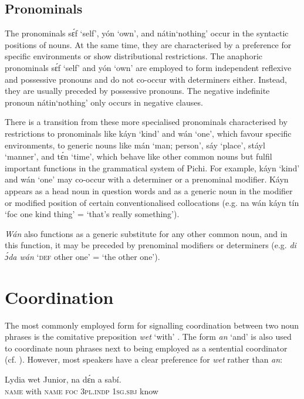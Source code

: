 \subsection{Pronominals}\label{sec:5.4.4}

The pronominals sɛ́f ‘self’, yón ‘own’, {\fff}and nátin‘nothing’ occur in the syntactic positions of nouns. At the same time, they are characterised by a preference for specific environments or show distributional restrictions. The anaphoric pronominals sɛ́f ‘self’ and yón ‘own’ are employed to form independent reflexive{\fff} and possessive pronouns and do not co-occur with determiners either. Instead, they are usually preceded by possessive pronouns. The negative indefinite pronoun nátin‘nothing’ only occurs in negative clauses. 


There is a transition from these more specialised pronominals characterised by restrictions to pronominals like káyn ‘kind’ and wán ‘one’, which favour specific environments, to generic nouns like mán ‘man; person’, sáy ‘place’, stáyl ‘manner’, and tɛ́n ‘time’, which behave like other common nouns but fulfil important functions in the grammatical system of Pichi. For example, káyn ‘kind’ and wán ‘one’ may co-occur with a determiner or a prenominal modifier. Káyn appears as a head noun in question words and as a generic noun{\fff} in the modifier or modified position of certain conventionalised collocations (e.g. na wán káyn tín ‘foc one kind thing’ = ‘that’s really something’). 



\textit{Wán} also functions as a generic substitute for any other common noun, and in this function, it may be preceded by prenominal modifiers or determiners (e.g. \textit{di ɔ́da wán} ‘\textsc{def} other one’ = ‘the other one’). 


\section{Coordination}\label{sec:5.5}

The most commonly employed form for signalling coordination between two noun phrases is the comitative preposition \textit{wet} ‘with’ . The form \textit{an} ‘and’ is also used to coordinate noun phrases  next to being employed as a sentential coordinator (cf. ). However, most speakers have a clear preference for \textit{wet} rather than \textit{an}: 


\ea%
    \label{ex:key:297}
    \gll Lydia  wet    Junior,  na  dɛ́n    a    sabí.\\
\textsc{name}  with    \textsc{name}  \textsc{foc}  \textsc{3pl.indp}  \textsc{1sg.sbj}  know\\

